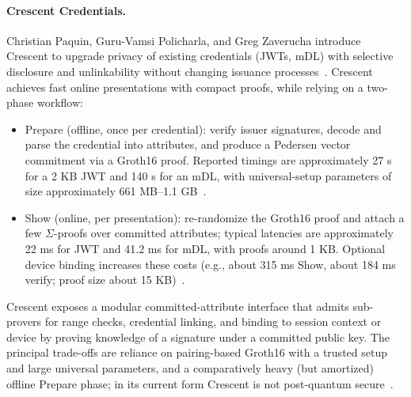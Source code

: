 \paragraph{Crescent Credentials.}
Christian Paquin, Guru-Vamsi Policharla, and Greg Zaverucha introduce Crescent to upgrade privacy of existing credentials (JWTs, mDL) with selective disclosure and unlinkability without changing issuance processes~\cite{cryptoeprint:2024/2013}. Crescent achieves fast online presentations with compact proofs, while relying on a two-phase workflow:
\begin{itemize}
  \item Prepare (offline, once per credential): verify issuer signatures, decode and parse the credential into attributes, and produce a Pedersen vector commitment via a Groth16 proof. Reported timings are approximately 27 s for a 2 KB JWT and 140 s for an mDL, with universal-setup parameters of size approximately 661 MB–1.1 GB~\cite[\S4]{cryptoeprint:2024/2013}.
  \item Show (online, per presentation): re-randomize the Groth16 proof and attach a few $\Sigma$-proofs over committed attributes; typical latencies are approximately 22 ms for JWT and 41.2 ms for mDL, with proofs around 1 KB. Optional device binding increases these costs (e.g., about 315 ms Show, about 184 ms verify; proof size about 15 KB)~\cite[\S4]{cryptoeprint:2024/2013}.
\end{itemize}
Crescent exposes a modular committed-attribute interface that admits sub-provers for range checks, credential linking, and binding to session context or device by proving knowledge of a signature under a committed public key. The principal trade-offs are reliance on pairing-based Groth16 with a trusted setup and large universal parameters, and a comparatively heavy (but amortized) offline Prepare phase; in its current form Crescent is not post-quantum secure~\cite{groth2016size}.

